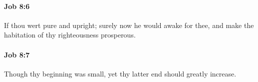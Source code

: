 		\paragraph{Job 8:6} %
			\label{JOB-8-6}

			If thou wert pure and upright; surely now he would awake for thee, and make the habitation of thy righteousness prosperous.


		\paragraph{Job 8:7} %
			\label{JOB-8-7}

			Though thy beginning was small, yet thy latter end should greatly increase.


